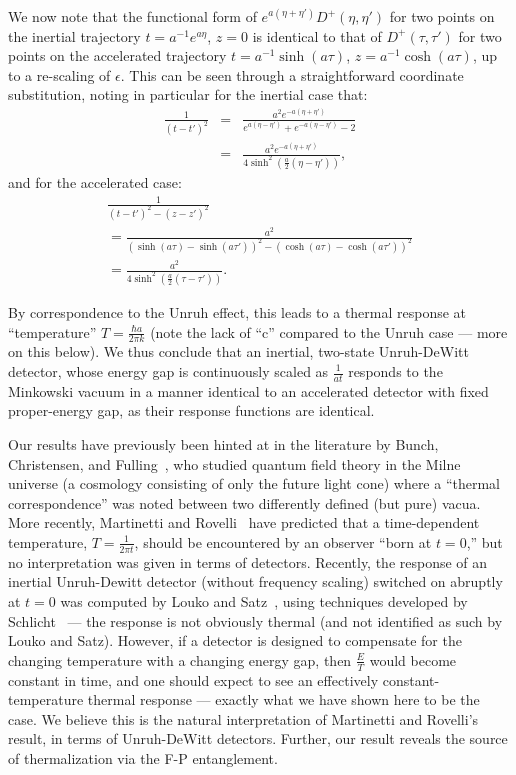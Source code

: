 \documentclass[aps,prl,twocolumn,showpacs]{revtex4}
\begin{document}
We now note that the functional form of $e^{a(\eta + \eta')}D^{+}(\eta, \eta')$ for two points on the inertial trajectory $t = a^{-1}e^{a \eta}$, $z=0$ is identical to that of $D^{+}(\tau, \tau')$ for two points on the accelerated trajectory $t = a^{-1} \sinh(a \tau )$, $z = a^{-1} \cosh(a \tau)$, up to a re-scaling of $\epsilon$.  This can be seen through a straightforward coordinate substitution, noting in particular for the inertial case that:
\begin{eqnarray*}
\frac{1}{(t - t')^{2}} &=& \frac{a^2 e^{-a(\eta + \eta')}}{e^{a (\eta - \eta')} + e^{- a (\eta - \eta')} - 2} \\
&=& \frac{a^2 e^{-a(\eta + \eta')}}{4 \sinh^{2}(\frac{a}{2}(\eta - \eta'))},
\end{eqnarray*}
and for the accelerated case:
\begin{gather*}
\frac{1}{(t - t')^{2} - (z - z')^{2}} \\
 = \frac{a^2}{(\sinh(a \tau) - \sinh(a \tau'))^{2} - (\cosh(a \tau) - \cosh(a \tau'))^{2}} \\
 = \frac{a^2}{4 \sinh^{2}(\frac{a}{2}(\tau - \tau'))}.
\end{gather*}

By correspondence to the Unruh effect, this leads to a thermal response at ``temperature'' $T = \frac{\hbar a}{2 \pi k}$ (note the lack of ``c'' compared to the Unruh case \---- more on this below).  We thus conclude that an inertial, two-state Unruh-DeWitt detector, whose energy gap is continuously scaled as $\frac{1}{at}$ responds to the Minkowski vacuum in a manner identical to an accelerated detector with fixed proper-energy gap, as their response functions are identical.

Our results have previously been hinted at in the literature by Bunch, Christensen, and Fulling~\cite{bunch1, birrell1}, who studied quantum field theory in the Milne universe (a cosmology consisting of only the future light cone) where a ``thermal correspondence'' was noted between two differently defined (but pure) vacua.  More recently, Martinetti and Rovelli~\cite{rovelli10} have predicted that a time-dependent temperature, $T = \frac{1}{2 \pi t}$, should be encountered by an observer ``born at $t=0$,'' but no interpretation was given in terms of detectors.  Recently, the response of an inertial Unruh-Dewitt detector (without frequency scaling) switched on abruptly at $t=0$ was computed by Louko and Satz~\cite{louko1}, using techniques developed by Schlicht~\cite{schlicht1} \---- the response is not obviously thermal (and not identified as such by Louko and Satz).  However, if a detector is designed to compensate for the changing temperature with a changing energy gap, then $\frac{E}{T}$ would become constant in time, and one should expect to see an effectively constant-temperature thermal response \---- exactly what we have shown here to be the case.  We believe this is the natural interpretation of Martinetti and Rovelli's result, in terms of Unruh-DeWitt detectors.  Further, our result reveals the source of thermalization via the F-P entanglement.
\end{document}
